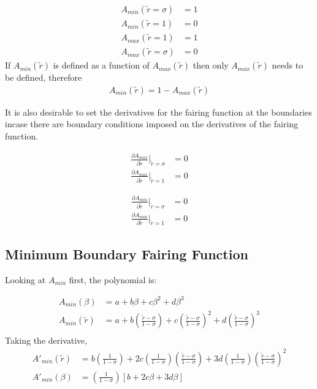 \documentclass[a4paper]{article}
\begin{document}
\begin{align*}
    A_{min}(\widetilde{r} = \sigma) &= 1\\
    A_{min}(\widetilde{r} = 1) &= 0 \\
    A_{max}(\widetilde{r} = 1) &= 1 \\
    A_{max}(\widetilde{r} = \sigma) &= 0 
\end{align*}
If $A_{min}(\widetilde{r})$ is defined as a function of $A_{max}(\widetilde{r})$
then only $A_{max}(\widetilde{r})$ needs to be defined, therefore 
\begin{align*}
    A_{min}(\widetilde{r}) = 1 - A_{max}(\widetilde{r}) 
\end{align*}

It is also desirable to set the derivatives for the fairing function at the 
boundaries incase there are boundary conditions imposed on the derivatives of 
the fairing function.

\begin{align*}
    \frac{\partial A_{max}}{\partial \widetilde{r}}|_{\widetilde{r}= \sigma} &= 0\\
    \frac{\partial A_{max}}{\partial \widetilde{r}}|_{\widetilde{r}= 1} &= 0    
\end{align*}

\begin{align*}
    \frac{\partial A_{min}}{\partial \widetilde{r}}|_{\widetilde{r}= \sigma} &= 0\\
    \frac{\partial A_{min}}{\partial \widetilde{r}}|_{\widetilde{r}= 1} &= 0    
\end{align*}

\subsection{Minimum Boundary Fairing Function}

Looking at $A_{min}$ first, the polynomial is:

\begin{align*}
    A_{min} \left( \beta \right) &= 
    a + b \beta + c \beta^2 + d \beta^3                   \\
    A_{min} \left( \widetilde{r} \right) &= 
    a + b \left( \frac{\widetilde{r} - \sigma}{1 - \sigma} \right)+
    c\left( \frac{\widetilde{r} - \sigma}{1 - \sigma} \right)  ^2+
    d\left( \frac{\widetilde{r} - \sigma}{1 - \sigma} \right)^3                    \\
\end{align*}
Taking the derivative,
\begin{align*}
    A'_{min} \left( \widetilde{r} \right) &= 
    b \left( \frac{1}{1 - \sigma} \right)+
    2 c\left( \frac{1}{1 - \sigma} \right)\left( \frac{\widetilde{r} - \sigma}{1 - \sigma} \right)  +
    3 d\left( \frac{1}{1-\sigma} \right)\left( \frac{\widetilde{r} - \sigma}{1 - \sigma} \right)^2\\
    A'_{min} \left( \beta \right) &= 
    \left( \frac{1}{1 - \sigma} \right)
    \left[
    b +
    2 c \beta + 
    3 d \beta
    \right]
\end{align*}
\end{document}
